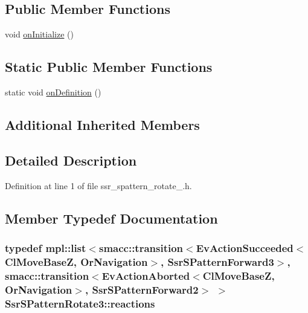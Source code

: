 \subsection*{Public Member Functions}
\begin{DoxyCompactItemize}
\item 
void \hyperlink{structSsrSPatternRotate3_a343a04a297e2b3801e4f7224fa6517a5}{on\+Initialize} ()
\end{DoxyCompactItemize}
\subsection*{Static Public Member Functions}
\begin{DoxyCompactItemize}
\item 
static void \hyperlink{structSsrSPatternRotate3_abd553dc366393f10fb622eb717b92f1b}{on\+Definition} ()
\end{DoxyCompactItemize}
\subsection*{Additional Inherited Members}


\subsection{Detailed Description}


Definition at line 1 of file ssr\+\_\+spattern\+\_\+rotate\+\_.\+h.



\subsection{Member Typedef Documentation}
\subsubsection[{\texorpdfstring{reactions}{reactions}}]{\setlength{\rightskip}{0pt plus 5cm}typedef mpl\+::list$<${\bf smacc\+::transition}$<$Ev\+Action\+Succeeded$<$Cl\+Move\+BaseZ, Or\+Navigation$>$, {\bf Ssr\+S\+Pattern\+Forward3}$>$, {\bf smacc\+::transition}$<$Ev\+Action\+Aborted$<$Cl\+Move\+BaseZ, Or\+Navigation$>$, {\bf Ssr\+S\+Pattern\+Forward2}$>$ $>$ {\bf Ssr\+S\+Pattern\+Rotate3\+::reactions}}\hypertarget{structSsrSPatternRotate3_aa49f94b16a49bb960d50f2a2066c425c}{}\label{structSsrSPatternRotate3_aa49f94b16a49bb960d50f2a2066c425c}


